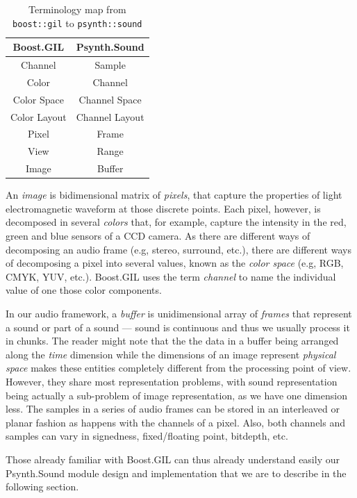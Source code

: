 \begin{table}[h]
  \centering
  \begin{tabular}{c|c}
    Boost.GIL & Psynth.Sound \\ \hline\hline
    Channel   & Sample \\
    Color     & Channel \\
    Color Space & Channel Space \\
    Color Layout & Channel Layout \\
    Pixel & Frame \\
    View & Range \\
    Image & Buffer
  \end{tabular}
  \caption{Terminology map from \texttt{boost::gil} to \texttt{psynth::sound}}
  \label{tab:gilmap}
\end{table}

An \emph{image} is bidimensional matrix of \emph{pixels}, that capture
the properties of light electromagnetic waveform at those discrete
points. Each pixel, however, is decomposed in several \emph{colors}
that, for example, capture the intensity in the red, green and blue
sensors of a CCD camera. As there are different ways of decomposing an
audio frame (e.g, stereo, surround, etc.), there are different ways of
decomposing a pixel into several values, known as the \emph{color
  space} (e.g, RGB, CMYK, YUV, etc.). Boost.GIL uses the term
\emph{channel} to name the individual value of one those color
components.

In our audio framework, a \emph{buffer} is unidimensional array of
\emph{frames} that represent a sound or part of a sound --- sound is
continuous and thus we usually process it in chunks. The reader might
note that the the data in a buffer being arranged along the
\emph{time} dimension while the dimensions of an image represent
\emph{physical space} makes these entities completely different from
the processing point of view. However, they share most representation
problems, with sound representation being actually a sub-problem of
image representation, as we have one dimension less. The samples in a
series of audio frames can be stored in an interleaved or planar
fashion as happens with the channels of a pixel. Also, both channels
and samples can vary in signedness, fixed/floating point, bitdepth,
etc.

Those already familiar with Boost.GIL can thus already understand
easily our Psynth.Sound module design and implementation that we are
to describe in the following section.

